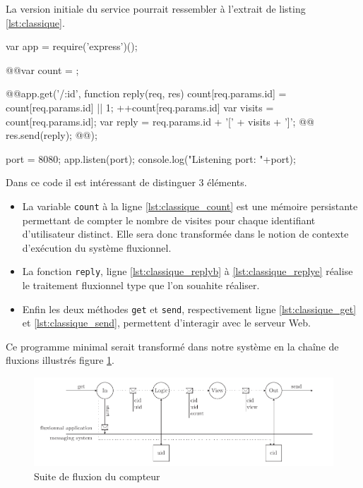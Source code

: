 La version initiale du service pourrait ressembler à l'extrait de listing \ref{lst:classique}.

\begin{code}[Javascript, caption={Service initial},label={lst:classique}]
var app = require('express')();

@\label{lst:classique_count}@var count = {};

@\label{lst:classique_get}\label{lst:classique_replyb}@app.get('/:id', function reply(req, res){
  count[req.params.id] = count[req.params.id]  || 1;
  ++count[req.params.id]
  var visits = count[req.params.id];
  var reply = req.params.id + '[' + visits + ']';
@\label{lst:classique_send}@  res.send(reply);
@\label{lst:classique_replye}@});

port = 8080;
app.listen(port);
console.log("Listening port: "+port);
\end{code}

Dans ce code il est intéressant de distinguer 3 éléments.
\begin{itemize}
  \item La variable \texttt{count} à la ligne \ref{lst:classique_count} est une mémoire persistante permettant de compter le nombre de visites pour chaque identifiant d'utilisateur distinct.
  Elle sera donc transformée dans le notion de contexte d'exécution du système fluxionnel.
  \item La fonction \texttt{reply}, ligne \ref{lst:classique_replyb} à \ref{lst:classique_replye} réalise le traitement fluxionnel type que l'on souahite réaliser.
  \item Enfin les deux méthodes \texttt{get} et \texttt{send}, respectivement ligne \ref{lst:classique_get} et \ref{lst:classique_send}, permettent d'interagir avec le serveur Web.
\end{itemize}

Ce programme minimal serait transformé dans notre système en la chaîne de fluxions illustrés figure \ref{fig:fluxions}.

\begin{figure}[h!]
  \includegraphics[width=\linewidth]{flux.pdf}
  \caption{Suite de fluxion du compteur}
  \label{fig:fluxions}
\end{figure}

